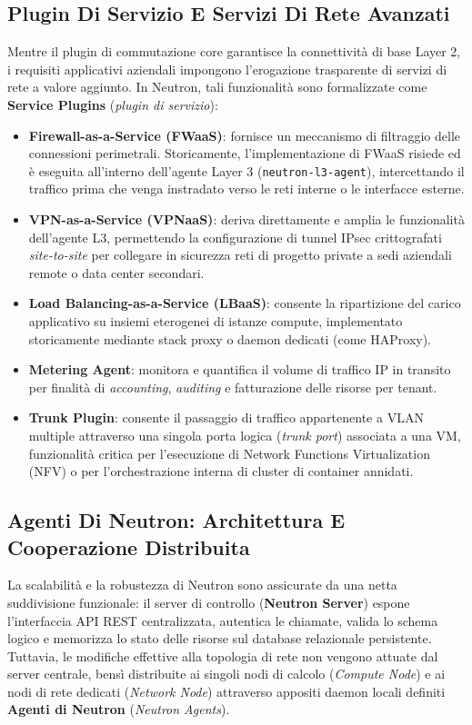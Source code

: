 \documentclass[11pt, a4paper]{article}
\begin{document}
\subsection{Plugin Di Servizio E Servizi Di Rete Avanzati}

Mentre il plugin di commutazione core garantisce la connettività di base Layer 2, i requisiti applicativi aziendali impongono l'erogazione trasparente di servizi di rete a valore aggiunto. In Neutron, tali funzionalità sono formalizzate come \textbf{Service Plugins} (\emph{plugin di servizio}):
\begin{itemize}
    \item \textbf{Firewall-as-a-Service (FWaaS)}: fornisce un meccanismo di filtraggio delle connessioni perimetrali. Storicamente, l'implementazione di FWaaS risiede ed è eseguita all'interno dell'agente Layer 3 (\texttt{neutron-l3-agent}), intercettando il traffico prima che venga instradato verso le reti interne o le interfacce esterne.
    \item \textbf{VPN-as-a-Service (VPNaaS)}: deriva direttamente e amplia le funzionalità dell'agente L3, permettendo la configurazione di tunnel IPsec crittografati \emph{site-to-site} per collegare in sicurezza reti di progetto private a sedi aziendali remote o data center secondari.
    \item \textbf{Load Balancing-as-a-Service (LBaaS)}: consente la ripartizione del carico applicativo su insiemi eterogenei di istanze compute, implementato storicamente mediante stack proxy o daemon dedicati (come HAProxy).
    \item \textbf{Metering Agent}: monitora e quantifica il volume di traffico IP in transito per finalità di \emph{accounting}, \emph{auditing} e fatturazione delle risorse per tenant.
    \item \textbf{Trunk Plugin}: consente il passaggio di traffico appartenente a VLAN multiple attraverso una singola porta logica (\emph{trunk port}) associata a una VM, funzionalità critica per l'esecuzione di Network Functions Virtualization (NFV) o per l'orchestrazione interna di cluster di container annidati.
\end{itemize}

\subsection{Agenti Di Neutron: Architettura E Cooperazione Distribuita}

La scalabilità e la robustezza di Neutron sono assicurate da una netta suddivisione funzionale: il server di controllo (\textbf{Neutron Server}) espone l'interfaccia API REST centralizzata, autentica le chiamate, valida lo schema logico e memorizza lo stato delle risorse sul database relazionale persistente. Tuttavia, le modifiche effettive alla topologia di rete non vengono attuate dal server centrale, bensì distribuite ai singoli nodi di calcolo (\emph{Compute Node}) e ai nodi di rete dedicati (\emph{Network Node}) attraverso appositi daemon locali definiti \textbf{Agenti di Neutron} (\emph{Neutron Agents}).
\end{document}
